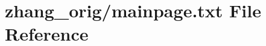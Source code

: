 \hypertarget{mainpage_8txt}{}\section{zhang\+\_\+orig/mainpage.txt File Reference}
\label{mainpage_8txt}
